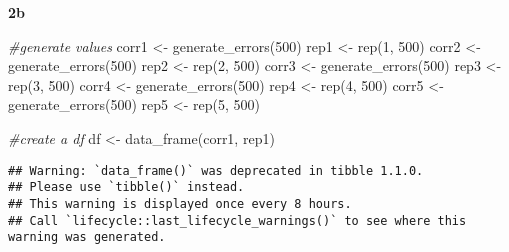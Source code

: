 \documentclass[
]{article}
\newenvironment{Shaded}{\begin{snugshade}}{\end{snugshade}}
\newcommand{\CommentTok}[1]{\textcolor[rgb]{0.56,0.35,0.01}{\textit{#1}}}
\newcommand{\DecValTok}[1]{\textcolor[rgb]{0.00,0.00,0.81}{#1}}
\newcommand{\FunctionTok}[1]{\textcolor[rgb]{0.00,0.00,0.00}{#1}}
\newcommand{\NormalTok}[1]{#1}
\newcommand{\OtherTok}[1]{\textcolor[rgb]{0.56,0.35,0.01}{#1}}
\begin{document}
\textbf{2b}

\begin{Shaded}
\begin{Highlighting}[]
\CommentTok{\#generate values}
\NormalTok{corr1 }\OtherTok{\textless{}{-}} \FunctionTok{generate\_errors}\NormalTok{(}\DecValTok{500}\NormalTok{)}
\NormalTok{rep1 }\OtherTok{\textless{}{-}} \FunctionTok{rep}\NormalTok{(}\DecValTok{1}\NormalTok{, }\DecValTok{500}\NormalTok{)}
\NormalTok{corr2 }\OtherTok{\textless{}{-}} \FunctionTok{generate\_errors}\NormalTok{(}\DecValTok{500}\NormalTok{)}
\NormalTok{rep2 }\OtherTok{\textless{}{-}} \FunctionTok{rep}\NormalTok{(}\DecValTok{2}\NormalTok{, }\DecValTok{500}\NormalTok{)}
\NormalTok{corr3 }\OtherTok{\textless{}{-}} \FunctionTok{generate\_errors}\NormalTok{(}\DecValTok{500}\NormalTok{)}
\NormalTok{rep3 }\OtherTok{\textless{}{-}} \FunctionTok{rep}\NormalTok{(}\DecValTok{3}\NormalTok{, }\DecValTok{500}\NormalTok{)}
\NormalTok{corr4 }\OtherTok{\textless{}{-}} \FunctionTok{generate\_errors}\NormalTok{(}\DecValTok{500}\NormalTok{)}
\NormalTok{rep4 }\OtherTok{\textless{}{-}} \FunctionTok{rep}\NormalTok{(}\DecValTok{4}\NormalTok{, }\DecValTok{500}\NormalTok{)}
\NormalTok{corr5 }\OtherTok{\textless{}{-}} \FunctionTok{generate\_errors}\NormalTok{(}\DecValTok{500}\NormalTok{)}
\NormalTok{rep5 }\OtherTok{\textless{}{-}} \FunctionTok{rep}\NormalTok{(}\DecValTok{5}\NormalTok{, }\DecValTok{500}\NormalTok{)}

\CommentTok{\#create a df}
\NormalTok{df }\OtherTok{\textless{}{-}} \FunctionTok{data\_frame}\NormalTok{(corr1, rep1)}
\end{Highlighting}
\end{Shaded}

\begin{verbatim}
## Warning: `data_frame()` was deprecated in tibble 1.1.0.
## Please use `tibble()` instead.
## This warning is displayed once every 8 hours.
## Call `lifecycle::last_lifecycle_warnings()` to see where this warning was generated.
\end{verbatim}
\end{document}
